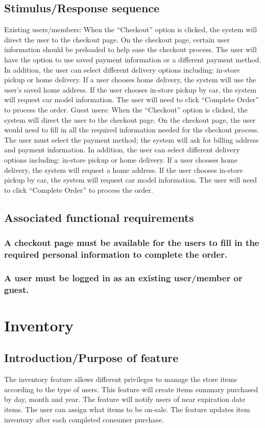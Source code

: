 \documentclass{scrreprt}
\begin{document}
\subsection{Stimulus/Response sequence}
Existing users/members:
When the “Checkout” option is clicked, the system will direct the user to the checkout page. On the checkout page, certain user information should be preloaded to help ease the checkout process. The user will have the option to use saved payment information or a different payment method. In addition, the user can select different delivery options including: in-store pickup or home delivery. If a user chooses home delivery, the system will use the user's saved home address. If the user chooses in-store pickup by car, the system will request car model information. The user will need to click “Complete Order” to process the order.
Guest users: 
When the “Checkout” option is clicked, the system will direct the user to the checkout page. On the checkout page, the user would need to fill in all the required information needed for the checkout process. The user must select the payment method; the system will ask for billing address and payment information. In addition, the user can select different delivery options including: in-store pickup or home delivery. If a user chooses home delivery, the system will request a home address. If the user chooses in-store pickup by car, the system will request car model information. The user will need to click “Complete Order” to process the order.


\subsection{Associated functional requirements}
\subsubsection[]{\normalfont A checkout page must be available for the users to fill in the required personal information to complete the order.}
\subsubsection[]{\normalfont A user must be logged in as an existing user/member or guest.}

\section{Inventory}
\subsection{Introduction/Purpose of feature}
The inventory feature allows different privileges to manage the store items according to the type of users. This feature will create items summary purchased by day, month and year. The feature will notify users of near expiration date items. The user can assign what items to be on-sale. The feature updates item inventory after each completed consumer purchase.
\end{document}
